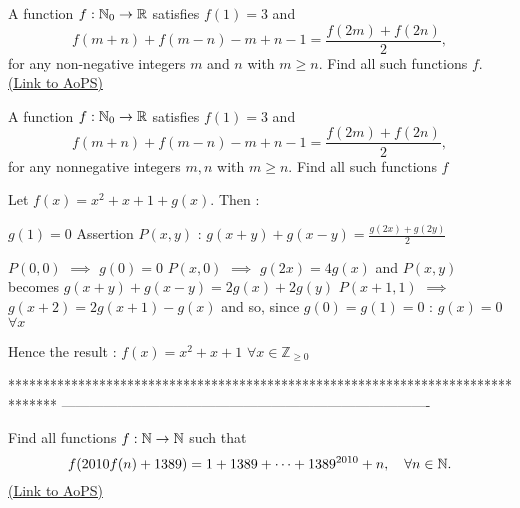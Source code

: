 \begin{problem}
	A function $f : \Bbb{N}_0 \to \Bbb{R}$ satisﬁes $f(1) = 3$ and \[f(m + n) + f(m - n) - m + n - 1 =\frac{f(2m) + f(2n)}{2},\]
for any non-negative integers $m$ and $n$ with $m \geq n.$ Find all such functions $f$.
	\flushright \href{https://artofproblemsolving.com/community/c6h446945}{(Link to AoPS)}
\end{problem}



\begin{solution}
	\begin{tcolorbox}A function $f : \Bbb{N}_0 \to \Bbb{R}$ satisﬁes $f(1) = 3$ and \[f(m + n) + f(m - n) - m + n - 1 =\frac{f(2m) + f(2n)}{2},\]
for any nonnegative integers $m, n$ with $m \geq n.$ Find all such functions $f$\end{tcolorbox}
Let $f(x)=x^2+x+1+g(x)$. Then :

$g(1)=0$
Assertion $P(x,y)$ : $g(x+y)+g(x-y)=\frac{g(2x)+g(2y)}2$

$P(0,0)$ $\implies$ $g(0)=0$
$P(x,0)$ $\implies$ $g(2x)=4g(x)$ and $P(x,y)$ becomes $g(x+y)+g(x-y)=2g(x)+2g(y)$
$P(x+1,1)$ $\implies$ $g(x+2)=2g(x+1)-g(x)$ and so, since $g(0)=g(1)=0$ : $g(x)=0$ $\forall x$

Hence the result : $\boxed{f(x)=x^2+x+1}$ $\forall x\in\mathbb Z_{\ge 0}$
\end{solution}
*******************************************************************************
-------------------------------------------------------------------------------

\begin{problem}
	Find all functions $f:\Bbb{N}\to \Bbb{N}$ such that
\[f(2010f(n)+1389)=1+1389+\cdots+1389^{2010}+n, \quad \forall n \in \Bbb{N}.\]
	\flushright \href{https://artofproblemsolving.com/community/c6h447178}{(Link to AoPS)}
\end{problem}



